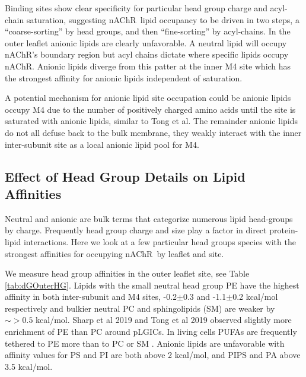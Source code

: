 \documentclass[preprint,3p,9pt,times,onecolumn]{elsarticle}
\newcommand{\nachr}{nAChR}
\begin{document}
Binding sites show clear specificity for particular head group charge and acyl-chain saturation, suggesting \nachr~lipid occupancy to be driven in two steps, a ``coarse-sorting'' by head groups, and then ``fine-sorting'' by acyl-chains. In the outer leaflet anionic lipids are clearly unfavorable. A neutral lipid will occupy \nachr's boundary region but acyl chains dictate where specific lipids occupy \nachr. Anionic lipids diverge from this patter at the inner M4 site which has the strongest affinity for anionic lipids independent of saturation. 

A potential mechanism for anionic lipid site occupation could be anionic lipids occupy M4 due to the number of positively charged amino acids until the site is saturated with anionic lipids, similar to Tong et al\cite{Tong2019}. The remainder anionic lipids do not all defuse back to the bulk membrane, they weakly interact with the inner inter-subunit site as a local anionic lipid pool for M4. 

\subsection{Effect of Head Group Details on Lipid Affinities}


Neutral and anionic are bulk terms that categorize numerous lipid head-groups by charge. Frequently head group charge and size play a factor in direct protein-lipid interactions. Here we look at a few particular head groups species with the strongest affinities for occupying \nachr~by leaflet and site.

We measure head group affinities in the outer leaflet site, see Table \ref{tab:dGOuterHG}.  Lipids with the small neutral head group PE have the highest affinity in both inter-subunit and M4 sites, -0.2$\pm$0.3 and -1.1$\pm$0.2 kcal/mol respectively and bulkier neutral PC and sphingolipids (SM) are weaker by $\sim > 0.5$ kcal/mol. Sharp et al 2019\cite{Sharp2019} and Tong et al 2019\cite{Tong2019} observed slightly more enrichment of PE than PC around pLGICs. In living cells PUFAs are frequently tethered to PE more than to PC or SM \cite{Isolated1969, Taguchi2010, Breckenridge1973,Ingolfsson2017b,Gamba2005,Lorent2020}. Anionic lipids are unfavorable with affinity values for PS and PI are both above 2 kcal/mol, and PIPS and PA above 3.5 kcal/mol.
\end{document}
